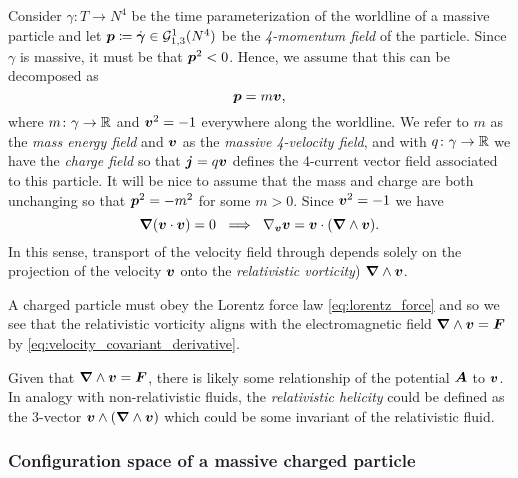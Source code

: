 \documentclass{article}
\begin{document}
Consider $\gamma \colon T \to N^4$ be the time parameterization of the worldline of a massive particle and let $\boldsymbol{p} \coloneqq \dot{\boldsymbol{\gamma}} \in \mathcal{G}_{1,3}^1(N^4)$ be the \emph{4-momentum field} of the particle. Since $\gamma$ is massive, it must be that $\boldsymbol{p}^2<0$. Hence, we assume that this can be decomposed as
\begin{equation}
    \boldsymbol{p} = m \boldsymbol{v},
\end{equation}
where $m\colon \gamma \to \mathbb{R}$ and $\boldsymbol{v}^2=-1$ everywhere along the worldline. We refer to $m$ as the \emph{mass energy field} and $\boldsymbol{v}$ as the \emph{massive 4-velocity field}, and with $q\colon \gamma \to \mathbb{R}$ we have the \emph{charge field} so that $\boldsymbol{j}=q\boldsymbol{v}$ defines the $4$-current vector field associated to this particle. It will be nice to assume that the mass and charge are both unchanging so that $\boldsymbol{p}^2=-m^2$ for some $m>0$. Since $\boldsymbol{v}^2=-1$ we have
\begin{equation}
\label{eq:velocity_covariant_derivative}
    \boldsymbol{\nabla} ({\boldsymbol{v}} \cdot {\boldsymbol{v}}) = 0 ~\implies~ \nabla_{\boldsymbol{v}} {\boldsymbol{v}} =  {\boldsymbol{v}}\cdot (\boldsymbol{\nabla} \wedge {\boldsymbol{v}}).
\end{equation}
In this sense, transport of the velocity field through depends solely on the projection of the velocity ${\boldsymbol{v}}$ onto the \emph{relativistic vorticity}) $\boldsymbol{\nabla} \wedge {\boldsymbol{v}}$.

A charged particle must obey the Lorentz force law \cref{eq:lorentz_force} and so we see that the relativistic vorticity aligns with the electromagnetic field $\boldsymbol{\nabla} \wedge \boldsymbol{v} = \boldsymbol{F}$ by \cref{eq:velocity_covariant_derivative}.

\begin{remark}
Given that $\boldsymbol{\nabla} \wedge \boldsymbol{v} = \boldsymbol{F}$, there is likely some relationship of the potential $\boldsymbol{A}$ to $\boldsymbol{v}$. In analogy with non-relativistic fluids, the \emph{relativistic helicity} could be defined as the 3-vector $\boldsymbol{v}\wedge (\boldsymbol{\nabla} \wedge \boldsymbol{v})$ which could be some invariant of the relativistic fluid.
\end{remark}



\subsubsection{Configuration space of a massive charged particle}
\end{document}
